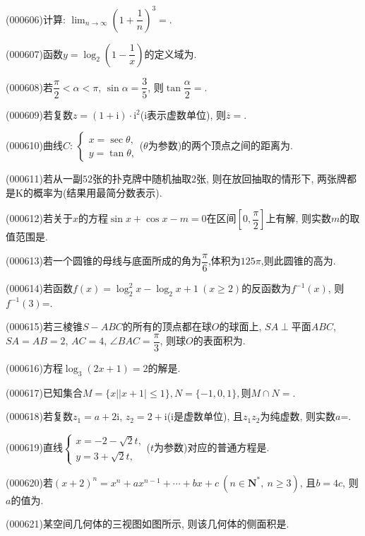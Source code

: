\item (000606)计算: $\displaystyle\lim_{n\to\infty}(1+\dfrac1n)^3=$.
\item (000607)函数$y=\log_2(1-\dfrac1x)$的定义域为.
\item (000608)若$\dfrac{\pi}2<\alpha<\pi$, $\sin\alpha=\dfrac35$, 则$\tan\dfrac{\alpha}2=$.
\item (000609)若复数$z=(1+\mathrm{i})\cdot \mathrm{i}^2$($\mathrm{i}$表示虚数单位), 则$\overline z=$.
\item (000610)曲线$C$: $\begin{cases} x=\sec\theta, \\ y=\tan\theta, \end{cases}$($\theta$为参数)的两个顶点之间的距离为.
\item (000611)若从一副$52$张的扑克牌中随机抽取$2$张, 则在放回抽取的情形下, 两张牌都是K的概率为(结果用最简分数表示).
\item (000612)若关于$x$的方程$\sin x+\cos x-m=0$在区间$[0,\dfrac{\pi}2]$上有解, 则实数$m$的取值范围是.
\item (000613)若一个圆锥的母线与底面所成的角为$\dfrac{\pi}6$,体积为$125\pi$,则此圆锥的高为.
\item (000614)若函数$f(x)=\log_2^2x-\log_2 x+1 \ (x\ge 2)$的反函数为$f^{-1}(x)$, 则$f^{-1}(3)$=.
\item (000615)若三棱锥$S-ABC$的所有的顶点都在球$O$的球面上, $SA\perp$平面$ABC$, $SA=AB=2$, $AC=4$, $\angle BAC=\dfrac{\pi}3$, 则球$O$的表面积为.
\item (000616)方程$\log_3(2x+1)=2$的解是.
\item (000617)已知集合$M=\{x||x+1|\le 1\},N=\{-1,0,1\},$则$M\cap N=$.
\item (000618)若复数$z_1=a+2\mathrm{i}$, $z_2=2+\mathrm{i}$($\mathrm{i}$是虚数单位), 且$z_1z_2$为纯虚数, 则实数$a$=.
\item (000619)直线$\begin{cases} x=-2-\sqrt2 t,  \\y=3+\sqrt2 t, \end{cases}$($t$为参数)对应的普通方程是.
\item (000620)若$(x+2)^n=x^n+ax^{n-1}+\cdots+bx+c \ (n\in \mathbf{N}^*, \ n\ge 3)$, 且$b=4c$, 则$a$的值为.
\item (000621)某空间几何体的三视图如图所示, 则该几何体的侧面积是.
